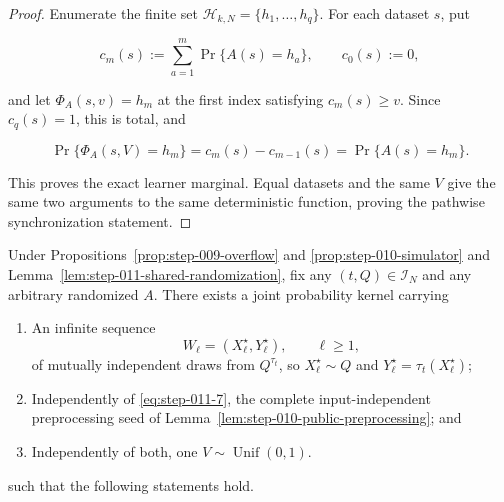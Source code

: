 \begin{proof}
Enumerate the finite set
\(\mathcal H_{k,N}=\{h_1,\ldots,h_q\}\). For each dataset \(s\), put

\[
  c_m(s):=\sum_{a=1}^m\Pr\{A(s)=h_a\},\qquad c_0(s):=0,
\]

and let \(\Phi_A(s,v)=h_m\) at the first index satisfying
\(c_m(s)\ge v\). Since \(c_q(s)=1\), this is total, and

\[
  \Pr\{\Phi_A(s,V)=h_m\}=c_m(s)-c_{m-1}(s)
  =\Pr\{A(s)=h_m\}.
\]

This proves the exact learner marginal. Equal datasets and the same \(V\)
give the same two arguments to the same deterministic function, proving
the pathwise synchronization statement. \end{proof}

\begin{lemma}\label{lem:step-011-coupling-kernel}
Under Propositions~\ref{prop:step-009-overflow} and
\ref{prop:step-010-simulator} and
Lemma~\ref{lem:step-011-shared-randomization}, fix any
\((t,Q)\in\mathcal I_N\)
and any arbitrary randomized \(A\). There exists a joint probability
kernel carrying

\begin{enumerate}
\item An infinite sequence
   \[
     W_\ell=(X_\ell^\star,Y_\ell^\star),\qquad \ell\ge1,
   \tag{S11.7}\label{eq:step-011-7}
   \]
   of mutually independent draws from \(Q^{\tau_t}\), so
   \(X_\ell^\star\sim Q\) and
   \(Y_\ell^\star=\tau_t(X_\ell^\star)\);
\item Independently of \eqref{eq:step-011-7}, the complete input-independent preprocessing seed
   of Lemma~\ref{lem:step-010-public-preprocessing}; and
\item Independently of both, one \(V\sim\operatorname{Unif}(0,1)\).
\end{enumerate}

such that the following statements hold.


\end{lemma}
